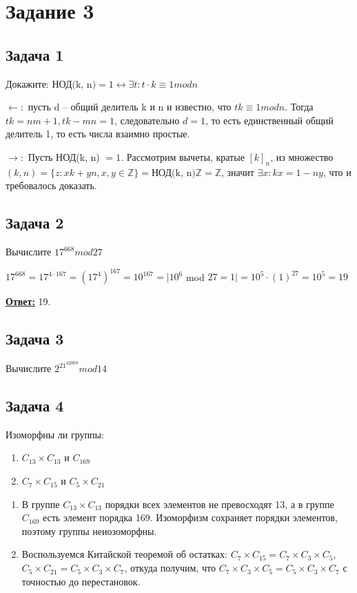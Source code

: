\documentclass[a4paper,14pt]{article} %
\begin{document}

\section{Задание 3}
\subsection{Задача 1}
Докажите: $\text{НОД(k, n)} = 1 \leftrightarrow \exists t : t \cdot k \equiv 1 mod n$

$\leftarrow :$ пусть d --  общий делитель k и n и известно, что $tk \equiv 1 mod n$. Тогда $tk = nm +1, tk - mn = 1$, следовательно $d = 1$, то есть единственный общий делитель 1, то есть числа взаимно простые.

$\rightarrow :$ Пусть НОД(k, n) $ = 1$. Рассмотрим вычеты, кратые $[k]_n$, из множество $(k, n) = \{z : xk + yn, x, y \in \mathds{Z} \} = \text{НОД(k, n)} \mathds{Z} = \mathds{Z}$, значит $\exists x : kx = 1 - ny$, что и требовалось доказать.

\subsection{Задача 2}
Вычислите $17^{668} mod 27$

$17^{668} = 17^{4 \cdot 167} = (17^{4})^{167} = 10^{167} = | 10^6$ mod $27 = 1 | = 10^5 \cdot (1)^27 = 10^5 = 19$ 

\underline{\textbf{Ответ:}} 19.

\subsection{Задача 3}
Вычислите $2^{21^{42069}} mod 14$


\subsection{Задача 4}
Изоморфны ли группы:
\begin{enumerate}
	\item $C_{13} \times C_{13}$ и $C_{169}$
	\item $C_7 \times C_{15}$ и $C_5 \times C_{21}$
\end{enumerate}

\begin{enumerate}
	\item В группе $C_{13} \times C_{13}$ порядки всех элементов не превосходят 13, а в группе $C_{169}$ есть элемент порядка 169. Изоморфизм сохраняет порядки элементов, поэтому группы неиозоморфны.
	\item Воспользуемся Китайской теоремой об остатках: $C_7 \times C_{15} = C_7 \times C_3 \times C_5$, $C_5 \times C_{21} = C_5 \times C_3 \times C_7$, откуда получим, что $C_7 \times C_3 \times C_5 = C_5 \times C_3 \times C_7$ с точностью до перестановок.
\end{enumerate}
\end{document}
